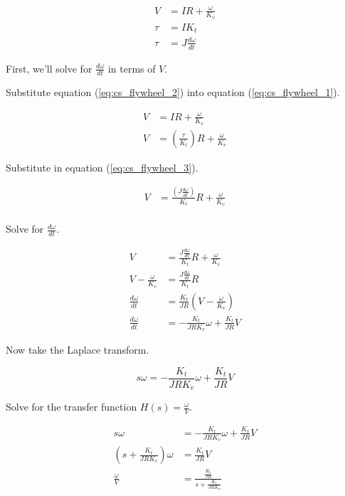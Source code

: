 \begin{align}
  V &= IR + \frac{\omega}{K_v} \label{eq:cs_flywheel_1} \\
  \tau &= I K_t \label{eq:cs_flywheel_2} \\
  \tau &= J \frac{d\omega}{dt} \label{eq:cs_flywheel_3}
\end{align}

First, we'll solve for $\frac{d\omega}{dt}$ in terms of $V$.

Substitute equation (\ref{eq:cs_flywheel_2}) into equation
 (\ref{eq:cs_flywheel_1}).

\begin{align*}
  V &= IR + \frac{\omega}{K_v} \\
  V &= \left(\frac{\tau}{K_t}\right) R + \frac{\omega}{K_v}
\end{align*}

Substitute in equation (\ref{eq:cs_flywheel_3}).

\begin{align*}
  V &= \frac{\left(J \frac{d\omega}{dt}\right)}{K_t} R + \frac{\omega}{K_v} \\
\end{align*}

Solve for $\frac{d\omega}{dt}$.

\begin{align*}
  V &= \frac{J \frac{d\omega}{dt}}{K_t} R + \frac{\omega}{K_v} \\
  V - \frac{\omega}{K_v} &= \frac{J \frac{d\omega}{dt}}{K_t} R \\
  \frac{d\omega}{dt} &= \frac{K_t}{JR} \left(V - \frac{\omega}{K_v}\right) \\
  \frac{d\omega}{dt} &= -\frac{K_t}{JRK_v} \omega + \frac{K_t}{JR} V
\end{align*}

Now take the Laplace transform.

\begin{equation}
  s \omega = -\frac{K_t}{JRK_v} \omega + \frac{K_t}{JR} V
  \label{eq:cs_motor_tf}
\end{equation}

Solve for the transfer function $H(s) = \frac{\omega}{V}$.

\begin{align*}
  s \omega &= -\frac{K_t}{JRK_v} \omega + \frac{K_t}{JR} V \\
  \left(s + \frac{K_t}{JRK_v}\right) \omega &= \frac{K_t}{JR} V \\
  \frac{\omega}{V} &= \frac{\frac{K_t}{JR}}{s + \frac{K_t}{JRK_v}} \\
\end{align*}

